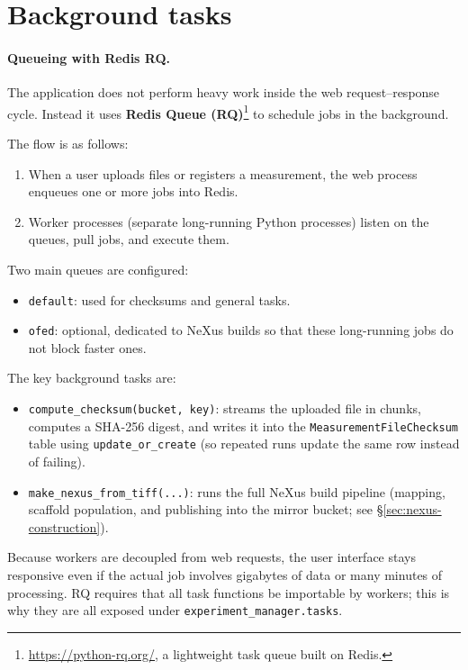
\section{Background tasks}\label{sec:background-tasks}

\paragraph{Queueing with Redis RQ.}
The application does not perform heavy work inside the web request–response cycle.  
Instead it uses \textbf{Redis Queue (RQ)}\footnote{\url{https://python-rq.org/}, a lightweight task queue built on Redis.} 
to schedule jobs in the background.  

The flow is as follows:  
\begin{enumerate}
	\item When a user uploads files or registers a measurement, the web process enqueues one or more jobs into Redis.  
	\item Worker processes (separate long-running Python processes) listen on the queues, pull jobs, and execute them.  
\end{enumerate}

Two main queues are configured:  
\begin{itemize}
	\item \texttt{default}: used for checksums and general tasks.  
	\item \texttt{ofed}: optional, dedicated to NeXus builds so that these long-running jobs do not block faster ones.  
\end{itemize}

The key background tasks are:  
\begin{itemize}
	\item \texttt{compute\_checksum(bucket, key)}: streams the uploaded file in chunks, computes a SHA-256 digest, 
	and writes it into the \texttt{MeasurementFileChecksum} table using \texttt{update\_or\_create} 
	(so repeated runs update the same row instead of failing).  
	\item \texttt{make\_nexus\_from\_tiff(...)}: runs the full NeXus build pipeline 
	(mapping, scaffold population, and publishing into the mirror bucket; see \S\ref{sec:nexus-construction}).  
\end{itemize}

Because workers are decoupled from web requests, the user interface stays responsive 
even if the actual job involves gigabytes of data or many minutes of processing.  
RQ requires that all task functions be importable by workers; this is why they are all exposed under 
\texttt{experiment\_manager.tasks}.

